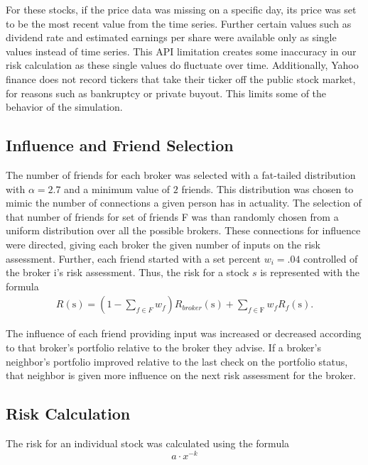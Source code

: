 \documentclass[letterpaper, 11 pt, proceedings]{IEEEtran}
\begin{document}
	For these stocks, if the price data was missing on a specific day, its price was set to be the most recent value from the time series. Further certain values such as dividend rate and estimated earnings per share were available only as single values instead of time series. This API limitation creates some inaccuracy in our risk calculation as these single values do fluctuate over time. Additionally, Yahoo finance does not record tickers that take their ticker off the public stock market, for reasons such as bankruptcy or private buyout. This limits some of the behavior of the simulation.  
	

	\subsection{Influence and Friend Selection}\label{subsec:friends}
	The number of friends for each broker was selected with a fat-tailed distribution with $\alpha = 2.7$ and a minimum value of $2$ friends. This distribution was chosen to mimic the number of connections a given person has in actuality. The selection of that number of friends for set of friends F was than randomly chosen from a uniform distribution over all the possible brokers. These connections for influence were directed, giving each broker the given number of inputs on the risk assessment. Further, each friend started with a set percent $w_i = .04$ controlled of the broker i's risk assessment. Thus, the risk for a stock $s$ is represented with the formula 
	\begin{align}
		R(\text{s}) = (1-\sum\limits_{f\in F} w_f) R_{broker}(\text{s}) + \sum\limits_{f\in \text{F}} w_f R_f(\text{s}).\label{eq:weighted_assessment}
	\end{align}	
	
	The influence of each friend providing input was increased or decreased according to that broker's portfolio relative to the broker they advise. If a broker's neighbor's portfolio improved relative to the last check on the portfolio status, that neighbor is given more influence on the next risk assessment for the broker.

	\subsection{Risk Calculation}\label{subsec:risk}
	The risk for an individual stock was calculated using the formula \[
		a \cdot x^{-k}
		\]
		
\end{document}
